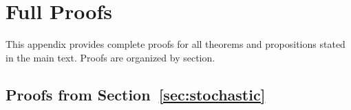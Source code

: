 
\section{Full Proofs}
\label{app:proofs}

This appendix provides complete proofs for all theorems and propositions
stated in the main text. Proofs are organized by section.


\subsection{Proofs from Section~\ref{sec:stochastic}}
\label{app:proofs:stochastic}

